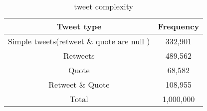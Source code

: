 
\begin{table}
	\centering
	\caption{tweet complexity }
	\label{tbl:object_size}
	\begin{adjustbox}{width=\columnwidth,center}	
		
		\begin{tabular}{|c|c|} \hline
			Tweet type & Frequency\\ \hline
			Simple tweets(retweet \& quote are null ) & 332,901\\ \hline
			Retweets & 489,562\\ \hline
			Quote & 68,582\\ \hline
			Retweet \& Quote & 108,955\\ \hline
			Total & 1,000,000 \\ \hline
			
			\hline\end{tabular}
	\end{adjustbox}
\end{table}

